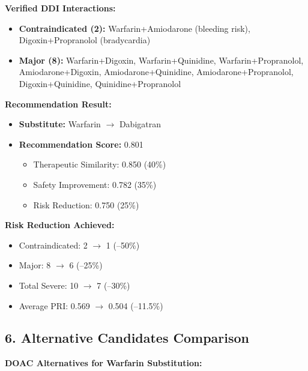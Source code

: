 \documentclass[11pt,a4paper]{article}
\begin{document}
\textbf{Verified DDI Interactions:}
\begin{itemize}
    \item \textbf{Contraindicated (2):} Warfarin+Amiodarone (bleeding risk), Digoxin+Propranolol (bradycardia)
    \item \textbf{Major (8):} Warfarin+Digoxin, Warfarin+Quinidine, Warfarin+Propranolol, Amiodarone+Digoxin, Amiodarone+Quinidine, Amiodarone+Propranolol, Digoxin+Quinidine, Quinidine+Propranolol
\end{itemize}

\textbf{Recommendation Result:}
\begin{itemize}
    \item \textbf{Substitute:} Warfarin $\rightarrow$ Dabigatran
    \item \textbf{Recommendation Score:} 0.801
    \begin{itemize}
        \item Therapeutic Similarity: 0.850 (40\%)
        \item Safety Improvement: 0.782 (35\%)
        \item Risk Reduction: 0.750 (25\%)
    \end{itemize}
\end{itemize}

\textbf{Risk Reduction Achieved:}
\begin{itemize}
    \item Contraindicated: 2 $\rightarrow$ 1 (--50\%)
    \item Major: 8 $\rightarrow$ 6 (--25\%)
    \item Total Severe: 10 $\rightarrow$ 7 (--30\%)
    \item Average PRI: 0.569 $\rightarrow$ 0.504 (--11.5\%)
\end{itemize}

\subsection*{6. Alternative Candidates Comparison}

\textbf{DOAC Alternatives for Warfarin Substitution:}
\end{document}

